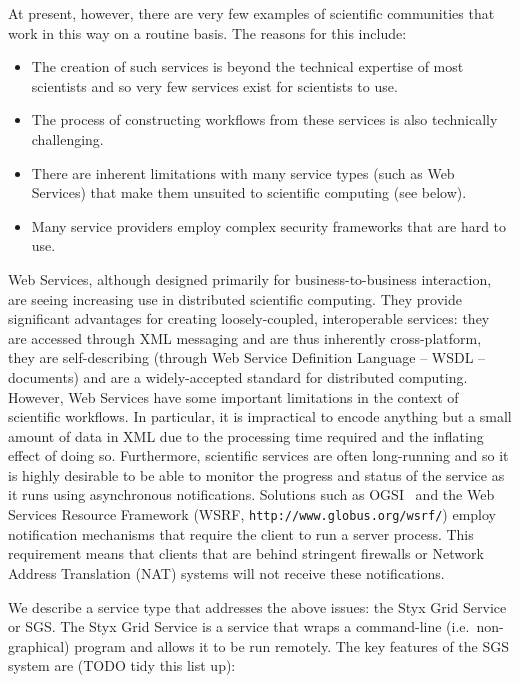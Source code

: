 \documentclass[a4paper]{article}
\begin{document}
At present, however, there are very few examples of scientific communities that work in this way on a routine basis.  The reasons for this include:

\begin{itemize}
\item The creation of such services is beyond the technical expertise of most scientists and so very few services exist for scientists to use.
\item The process of constructing workflows from these services is also technically challenging.
\item There are inherent limitations with many service types (such as Web Services) that make them unsuited to scientific computing (see below).
\item Many service providers employ complex security frameworks that are hard to use.
\end{itemize}

Web Services, although designed primarily for business-to-business interaction, are seeing increasing use in distributed scientific computing.  They provide significant advantages for creating loosely-coupled, interoperable services: they are accessed through XML messaging and are thus inherently cross-platform, they are self-describing (through Web Service Definition Language -- WSDL -- documents) and are a widely-accepted standard for distributed computing.  However, Web Services have some important limitations in the context of scientific workflows. In particular, it is impractical to encode anything but a small amount of data in XML due to the processing time required and the inflating effect of doing so.  Furthermore, scientific services are often long-running and so it is highly desirable to be able to monitor the progress and status of the service as it runs using asynchronous notifications.  Solutions such as OGSI~\cite{ogsi} and the Web Services Resource Framework (WSRF, \texttt{http://www.globus.org/wsrf/}) employ notification mechanisms that require the client to run a server process.  This requirement means that clients that are behind stringent firewalls or Network Address Translation (NAT) systems will not receive these notifications.

We describe a service type that addresses the above issues: the Styx Grid Service or SGS.  The Styx Grid Service is a service that wraps a command-line (i.e.\ non-graphical) program and allows it to be run remotely.  The key features of the SGS system are (TODO tidy this list up):
\end{document}

